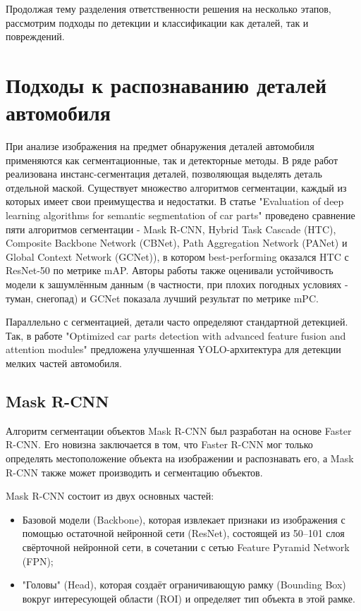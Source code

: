 Продолжая тему разделения ответственности решения на несколько этапов, рассмотрим подходы по детекции и классификации как деталей, так и повреждений.


\section{Подходы к распознаванию деталей автомобиля}\label{ch:1.3}


При анализе изображения на предмет обнаружения деталей автомобиля применяются как сегментационные, так и детекторные методы.
В ряде работ реализована инстанс-сегментация деталей, позволяющая выделять деталь отдельной маской. Существует множество алгоритмов сегментации, каждый из которых имеет свои преимущества и недостатки. 
В статье "Evaluation of deep learning algorithms for semantic segmentation of car parts" проведено сравнение пяти алгоритмов сегментации - Mask R-CNN, Hybrid Task Cascade (HTC), Composite Backbone Network (CBNet), Path Aggregation Network (PANet) и Global Context Network (GCNet)), в котором best-performing оказался HTC с ResNet-50 по метрике mAP. Авторы работы также оценивали устойчивость модели к зашумлённым данным (в частности, при плохих погодных условиях - туман, снегопад) и GCNet показала лучший результат по метрике mPC. \cite{src10}

Параллельно с сегментацией, детали часто определяют стандартной детекцией. Так, в работе "Optimized car parts detection with advanced feature fusion and attention modules" предложена улучшенная YOLO-архитектура для детекции мелких частей автомобиля. \cite{src11}

\subsection{Mask R-CNN}\label{ch:1.3.1}


Алгоритм сегментации объектов Mask R-CNN был разработан на основе Faster R-CNN. Его новизна заключается в том, что Faster R-CNN мог только определять местоположение объекта на изображении и распознавать его, а Mask R-CNN также может производить и сегментацию объектов.

Mask R-CNN состоит из двух основных частей:
\begin{itemize}
   \item Базовой модели (Backbone), которая извлекает признаки из изображения с помощью остаточной нейронной сети (ResNet), состоящей из 50–101 слоя свёрточной нейронной сети, в сочетании с сетью Feature Pyramid Network (FPN);
   \item "Головы" (Head), которая создаёт ограничивающую рамку (Bounding Box) вокруг интересующей области (ROI) и определяет тип объекта в этой рамке.
\end{itemize}

